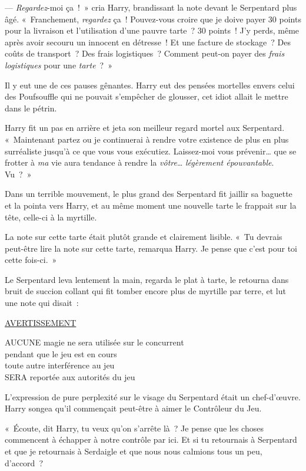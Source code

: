 --- \emph{Regardez}-moi ça~!~» cria Harry, brandissant la note devant le Serpentard plus âgé. «~Franchement, \emph{regardez} ça~! Pouvez-vous croire que je doive payer 30 points pour la livraison et l'utilisation d'une pauvre tarte~? 30 points~! J'y perds, même après avoir secouru un innocent en détresse~! Et une facture de stockage~? Des coûts de transport~? Des frais logistiques~? Comment peut-on payer des \emph{frais logistiques} pour une \emph{tarte}~?~»

Il y eut une de ces pauses gênantes. Harry eut des pensées mortelles envers celui des Poufsouffle qui ne pouvait s'empêcher de glousser, cet idiot allait le mettre dans le pétrin.

Harry fit un pas en arrière et jeta son meilleur regard mortel aux Serpentard. «~Maintenant partez ou je continuerai à rendre votre existence de plus en plus surréaliste jusqu'à ce que vous vous exécutiez. Laissez-moi vous prévenir… que se frotter à \emph{ma} vie aura tendance à rendre la \emph{vôtre}… \emph{légèrement épouvantable}. Vu~?~»

Dans un terrible mouvement, le plus grand des Serpentard fit jaillir sa baguette et la pointa vers Harry, et au même moment une nouvelle tarte le frappait sur la tête, celle-ci à la myrtille.

La note sur cette tarte était plutôt grande et clairement lisible. «~Tu devrais peut-être lire la note sur cette tarte, remarqua Harry. Je pense que c'est pour toi cette fois-ci.~»

Le Serpentard leva lentement la main, regarda le plat à tarte, le retourna dans bruit de succion collant qui fit tomber encore plus de myrtille par terre, et lut une note qui disait~:

\begin{writtenNote}\centering
\textsc{\underline{AVERTISSEMENT}}

\MakeUppercase{Aucune} magie ne sera utilisée sur le concurrent\\
pendant que le jeu est en cours\\
toute autre interférence au jeu\\
\MakeUppercase{sera} reportée aux autorités du jeu
\end{writtenNote}

L'expression de pure perplexité sur le visage du Serpentard était un chef-d'œuvre. Harry songea qu'il commençait peut-être à aimer le Contrôleur du Jeu.

«~Écoute, dit Harry, tu veux qu'on s'arrête là~? Je pense que les choses commencent à échapper à notre contrôle par ici. Et si tu retournais à Serpentard et que je retournais à Serdaigle et que nous nous calmions tous un peu, d'accord~?

